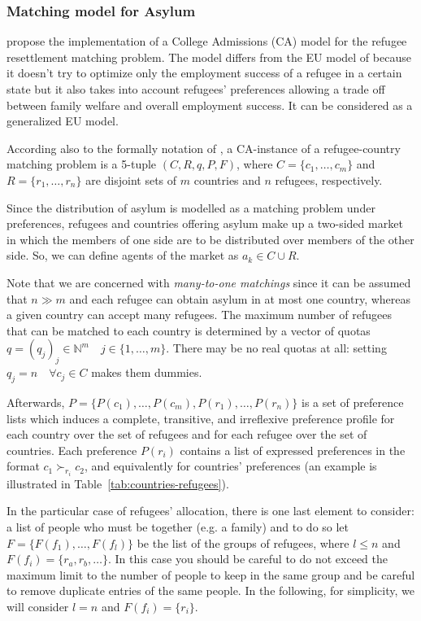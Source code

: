 \subsubsection{Matching model for Asylum}\label{matching-model-for-asylum}%
    \citet{olbergml,basshuysen,delacretaz_2020,fernandez} propose the implementation of a College Admissions (CA) model for the refugee resettlement matching problem.
    The model differs from the EU model of \citet{basshuysen} because it doesn't try to optimize only the employment success of a refugee in a certain state but it also takes into account refugees' preferences allowing a trade off between family welfare and overall employment success.
    It can be considered as a generalized EU model.

    According also to the formally notation of \citet{salles}, a CA-instance of a refugee-country matching problem is a 5-tuple \((C, R, q, P, F)\), where \(C = \{c_1, \dots, c_m\}\) and \(R = \{r_1, \dots, r_n\}\) are disjoint sets of \(m\) countries and \(n\) refugees, respectively.

    Since the distribution of asylum is modelled as a matching problem under preferences, refugees and countries offering asylum make up a two-sided market in which the members of one side are to be distributed over members of the other side.
    So, we can define agents of the market as \(a_k \in C \cup R\).
    
    Note that we are concerned with \textit{many-to-one matchings} since it can be assumed that \(n \gg m\) and each refugee can obtain asylum in at most one country, whereas a given country can accept many refugees. The maximum number of refugees that can be matched to each country is determined by a vector of quotas \(q = (q_j)_j \in \mathbb{N}^m \quad j\in\{1,\dots ,m\}\). There may be no real quotas at all: setting \(q_j = n \quad \forall c_j \in C\) makes them dummies.

    Afterwards, \(P = \{P(c_1), \dots, P(c_m), P(r_1), \dots, P(r_n)\}\) is a set of preference lists which induces a complete, transitive, and irreflexive preference profile for each country over the set of refugees and for each refugee over the set of countries.
    Each preference \(P(r_i)\) contains a list of expressed preferences in the format \(c_1 \succ_{r_i} c_2\), and equivalently for countries' preferences (an example is illustrated in Table~\ref{tab:countries-refugees}).

    In the particular case of refugees' allocation, there is one last element to consider: a list of people who must be together (e.g. a family) and to do so let \(F=\{F(f_1), \dots, F(f_l)\}\) be the list of the groups of refugees, where \(l \leq n\) and \(F(f_i) = \{r_a, r_b, \dots\}\).
    In this case you should be careful to do not exceed the maximum limit to the number of people to keep in the same group and be careful to remove duplicate entries of the same people.
    In the following, for simplicity, we will consider \(l=n\) and \(F(f_i)=\{r_i\}\).

